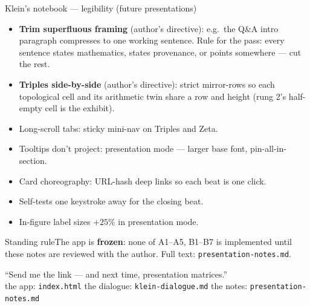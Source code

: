 \documentclass[aspectratio=169,10pt]{beamer}
\begin{document}
\begin{frame}{Klein's notebook --- legibility (future presentations)}
\begin{itemize}\itemsep3pt\footnotesize
\item[B1.] \textbf{Trim superfluous framing} (author's directive): e.g.\ the Q\&A intro paragraph compresses to one working sentence. Rule for the pass: every sentence states mathematics, states provenance, or points somewhere --- cut the rest.
\item[B2.] \textbf{Triples side-by-side} (author's directive): strict mirror-rows so each topological cell and its arithmetic twin share a row and height (rung 2's half-empty cell is the exhibit).
\item[B3.] Long-scroll tabs: sticky mini-nav on Triples and Zeta.
\item[B4.] Tooltips don't project: presentation mode --- larger base font, pin-all-in-section.
\item[B5.] Card choreography: URL-hash deep links so each beat is one click.
\item[B6.] Self-tests one keystroke away for the closing beat.
\item[B7.] In-figure label sizes $+25\%$ in presentation mode.
\end{itemize}
\begin{alertblock}{\footnotesize Standing rule}\scriptsize The app is \textbf{frozen}: none of A1--A5, B1--B7 is implemented until these notes are reviewed with the author. Full text: \texttt{presentation-notes.md}.\end{alertblock}
\end{frame}

\begin{frame}{}
\begin{center}
{\large ``Send me the link --- and next time, presentation matrices.''}\\[10pt]
{\footnotesize the app: \texttt{index.html} \quad the dialogue: \texttt{klein-dialogue.md} \quad the notes: \texttt{presentation-notes.md}}
\end{center}
\end{frame}
\end{document}
